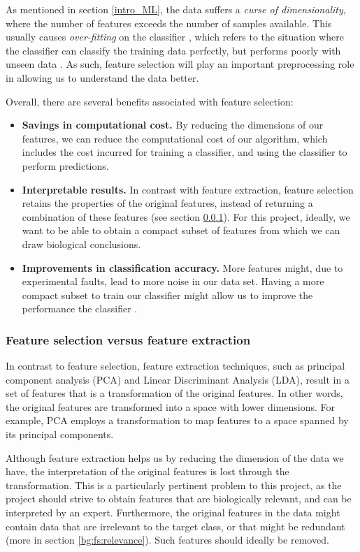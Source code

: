 \documentclass[12pt, twoside, a4paper]{article}
\begin{document}
As mentioned in section \ref{intro_ML}, the data suffers a \textit{curse of dimensionality}, where the number of features exceeds the number of samples available. This usually causes \textit{over-fitting} on the classifier \cite{RefWorks:115, RefWorks:175}, which refers to the situation where the classifier can classify the training data perfectly, but performs poorly with unseen data \cite{RefWorks:98}. As such, feature selection will play an important preprocessing role in allowing us to understand the data better.

Overall, there are several benefits associated with feature selection:
\begin{itemize}
  \item \textbf{Savings in computational cost.} By reducing the dimensions of our features, we can reduce the computational cost of our algorithm, which includes the cost incurred for training a classifier, and using the classifier to perform predictions.
  \item \textbf{Interpretable results.} In contrast with feature extraction, feature selection retains the properties of the original features, instead of returning a combination of these features (see section \ref{bg:fs:extraction}). For this project, ideally, we want to be able to obtain a compact subset of features from which we can draw biological conclusions.
  \item \textbf{Improvements in classification accuracy.} More features might, due to experimental faults, lead to more noise in our data set. Having a more compact subset to train our classifier might allow us to improve the performance the classifier \cite{RefWorks:174}.
\end{itemize}

\subsubsection{Feature selection versus feature extraction} \label{bg:fs:extraction}

In contrast to feature selection, feature extraction techniques, such as principal component analysis (PCA) and Linear Discriminant Analysis (LDA), result in a set of features that is a transformation of the original features. In other words, the original features are transformed into a space with lower dimensions. For example, PCA employs a transformation to map features to a space spanned by its principal components.

Although feature extraction helps us by reducing the dimension of the data we have, the interpretation of the original features is lost through the transformation. This is a particularly pertinent problem to this project, as the project should strive to obtain features that are biologically relevant, and can be interpreted by an expert. Furthermore, the original features in the data might contain data that are irrelevant to the target class, or that might be redundant (more in section \ref{bg:fs:relevance}). Such features should ideally be removed.
\end{document}
